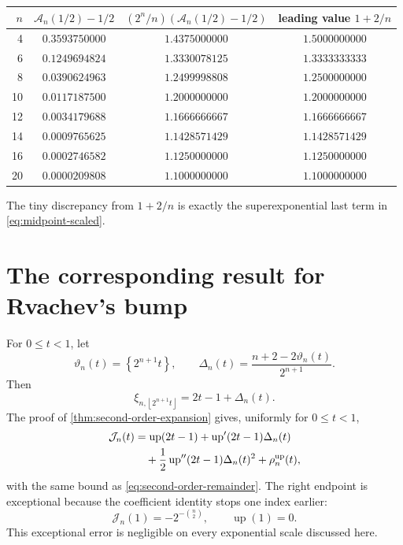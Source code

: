 \documentclass[11pt,oneside]{article}
\theoremstyle{definition}
\theoremstyle{remark}
\newcommand{\Up}{\operatorname{up}}
\newcommand{\floor}[1]{\left\lfloor #1\right\rfloor}
\newcommand{\fracpart}[1]{\left\{#1\right\}}
\begin{document}
\begin{center}
\begin{tabular}{@{}rccc@{}}
\toprule
$n$ & $\mathcal A_n(1/2)-1/2$ & $(2^n/n)(\mathcal A_n(1/2)-1/2)$ & leading value $1+2/n$\\
\midrule
4  & $0.3593750000$ & $1.4375000000$ & $1.5000000000$\\
6  & $0.1249694824$ & $1.3330078125$ & $1.3333333333$\\
8  & $0.0390624963$ & $1.2499998808$ & $1.2500000000$\\
10 & $0.0117187500$ & $1.2000000000$ & $1.2000000000$\\
12 & $0.0034179688$ & $1.1666666667$ & $1.1666666667$\\
14 & $0.0009765625$ & $1.1428571429$ & $1.1428571429$\\
16 & $0.0002746582$ & $1.1250000000$ & $1.1250000000$\\
20 & $0.0000209808$ & $1.1000000000$ & $1.1000000000$\\
\bottomrule
\end{tabular}
\end{center}
The tiny discrepancy from $1+2/n$ is exactly the superexponential last term in
\eqref{eq:midpoint-scaled}.

\section{The corresponding result for Rvachev's bump}
\label{sec:up-rate}

For $0\le t<1$, let
\begin{equation}
 \vartheta_n(t)=\fracpart{2^{n+1}t},
 \qquad
 \Delta_n(t)=\frac{n+2-2\vartheta_n(t)}{2^{n+1}}.          \label{eq:Delta-up}
\end{equation}
Then
\begin{equation}
 \xi_{n,\floor{2^{n+1}t}}=2t-1+\Delta_n(t).                \label{eq:up-center-drift}
\end{equation}
The proof of \cref{thm:second-order-expansion} gives, uniformly for $0\le t<1$,
\begin{align}
 \mathcal J_n(t)
 &=\Up(2t-1)+\Up'(2t-1)\Delta_n(t) \notag\\
 &\quad+\frac12\Up''(2t-1)\Delta_n(t)^2+\rho_n^{\Up}(t), \label{eq:up-second-order}
\end{align}
with the same bound as \eqref{eq:second-order-remainder}.  The right endpoint is
exceptional because the coefficient identity stops one index earlier:
\begin{equation}
 \mathcal J_n(1)=-2^{-\binom n2},
 \qquad \Up(1)=0.                                         \label{eq:J-right-endpoint}
\end{equation}
This exceptional error is negligible on every exponential scale discussed here.
\end{document}
